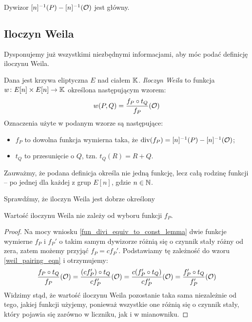 \begin{corollary}
Dywizor $[n]^{-1}(P) - [n]^{-1}(\mathcal{O})$ jest główny.
\end{corollary}

\subsection*{Iloczyn Weila}

Dysponujemy już wszystkimi niezbędnymi informacjami,
aby móc podać definicję iloczynu Weila.

\begin{definition}\label{weil_pairing_def}
Dana jest krzywa eliptyczna $E$ nad ciałem $\mathbb{K}$.
\emph{Iloczyn Weila} to funkcja
$w\colon E[n] \times E[n] \to \mathbb{K}$
określona następującym wzorem:
\begin{equation}\label{weil_pairing_eqn}
w(P, Q) = \frac{f_P \circ t_Q}{f_P}(\mathcal{O})
\end{equation}
Oznaczenia użyte w podanym wzorze są następujące:
\begin{itemize}
\item $f_P$ to dowolna funkcja wymierna taka,
że $\operatorname{div}(f_P) = [n]^{-1}(P) - [n]^{-1}(\mathcal{O})$;
\item $t_Q$ to przesunięcie o $Q$, tzn. $t_Q(R) = R+Q$.
\end{itemize}
\end{definition}

\begin{remark}
Zauważmy, że podana definicja określa nie jedną funkcję,
lecz całą rodzinę funkcji --
po jednej dla każdej z grup $E[n]$, gdzie $n \in \mathbb{N}$.
\end{remark}

Sprawdźmy, że iloczyn Weila jest dobrze określony

\begin{lemma}\label{weil_pairing_ignore_const_lemma}
Wartość iloczynu Weila nie zależy od wyboru funkcji $f_P$.
\end{lemma}

\begin{proof}
Na mocy wniosku \ref{fun_divi_equiv_to_const_lemma}
dwie funkcje wymierne $f_P$ i $f_P'$ o takim samym dywizorze
różnią się o czynnik stały różny od zera,
zatem możemy przyjąć $f_P = cf_P'$.
Podstawiamy tę zależność do wzoru \ref{weil_pairing_eqn} i otrzymujemy:
\begin{equation*}
\frac{f_P \circ t_Q}{f_P}(\mathcal{O}) =
\frac{(cf_P') \circ t_Q}{cf_P'}(\mathcal{O}) =
\frac{c(f_P' \circ t_Q)}{cf_P'}(\mathcal{O}) =
\frac{f_P' \circ t_Q}{f_P'}(\mathcal{O})
\end{equation*}
Widzimy stąd, że wartość iloczynu Weila pozostanie taka sama
niezależnie od tego, jakiej funkcji użyjemy,
ponieważ wszystkie one różnią się o czynnik stały,
który pojawia się zarówno w liczniku, jak i w mianowniku.
\end{proof}

